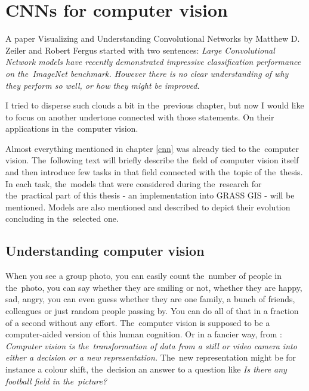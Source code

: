 \chapter{CNNs for computer vision}
\label{image-ann}

A paper Visualizing and Understanding Convolutional Networks by Matthew D. 
Zeiler and Robert Fergus \cite{zf-net} started with two sentences: \textit{Large 
Convolutional Network models have recently demonstrated impressive 
classification performance on the~ImageNet benchmark. However there is no clear 
understanding of why they perform so well, or how they might be improved.}

I tried to disperse such clouds a bit in the~previous chapter, but now I would 
like to focus on another undertone connected with those statements. On their 
applications in the~computer vision.

Almost everything mentioned in chapter \ref{cnn} was already tied to
the~computer vision. The~following text will briefly describe the~field of computer 
vision itself and then introduce few tasks in that field connected with
the~topic of the~thesis. In each task, the~models that were considered during
the~research for the~practical part of this thesis - an implementation into GRASS 
GIS - will be mentioned. Models are also mentioned and described to depict their
evolution concluding in the~selected one.


\section{Understanding computer vision}
\label{computer-vision}

When you see a group photo, you can easily count the~number of people in
the~photo, you can say whether they are smiling or not, whether they are happy, sad, 
angry, you can even guess whether they are one family, a bunch of friends, 
colleagues or just random people passing by. You can do all of that in a 
fraction of a second without any effort. The~computer vision is supposed to be a 
computer-aided version of this human cognition. Or in a fancier way, from 
\cite{opencv}: \textit{Computer vision is the~transformation of data from a 
still or video camera into either a decision or a new representation.} The~new 
representation might be for instance a colour shift, the~decision an answer to a 
question like \textit{Is there any football field in the~picture?}

